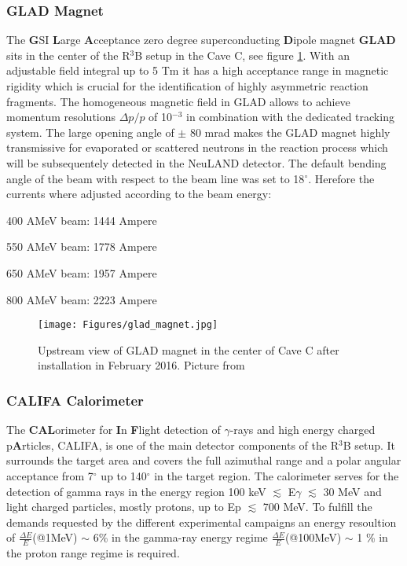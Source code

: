 \subsubsection{GLAD Magnet}
The \textbf{G}SI \textbf{L}arge \textbf{A}cceptance zero degree superconducting \textbf{D}ipole magnet \textbf{GLAD} sits in the center of the R$^3$B setup in the Cave C, see figure \ref{fig:GLAD}. With an adjustable field integral up to 5 Tm it has a high acceptance range in magnetic rigidity which is crucial for the identification of highly asymmetric reaction fragments. The homogeneous magnetic field in GLAD allows to achieve momentum resolutions $\Delta p/p$ of 10$^{-3}$ in combination with the dedicated tracking system.\newline
The large opening angle of $\pm$ 80 mrad makes the GLAD magnet highly transmissive for evaporated or scattered neutrons in the reaction process which will be subsequentely detected in the NeuLAND detector.\newline
The default bending angle of the beam with respect to the beam line was set to 18$^{\circ}$. Herefore the currents where adjusted according to the beam energy:
\newenvironment{tight_enumerate}{
\begin{enumerate}
  \setlength{\itemsep}{0pt}
  \setlength{\parskip}{0pt}
}{\end{enumerate}}
\begin{tight_enumerate}
\item 400 AMeV beam: 1444 Ampere
\item 550 AMeV beam: 1778 Ampere
\item 650 AMeV beam: 1957 Ampere
\item 800 AMeV beam: 2223 Ampere
\end{tight_enumerate}
\begin{figure}[htpb]
    \centering
    \texttt{[image: Figures/glad\_magnet.jpg]}
    \caption{
    Upstream view of GLAD magnet in the center of Cave C after installation in February 2016. Picture from \cite{wiki:GLAD} 
    }
    \label{fig:GLAD}
\end{figure}
\subsubsection{CALIFA Calorimeter}\label{sec:califa}
The \textbf{CAL}orimeter for \textbf{I}n \textbf{F}light detection of $\gamma$-rays and high energy charged p\textbf{A}rticles, CALIFA, is one of the main detector components of the R$^3$B setup. It surrounds the target area and covers the full azimuthal range and a polar angular acceptance from 7$^{\circ}$ up to 140$^{\circ}$ in the target region. The calorimeter serves for the detection of gamma rays in the energy region 100 keV $\lesssim$ E\textunderscore$\gamma$ $\lesssim$ 30 MeV and light charged particles, mostly protons, up to E\textunderscore p $\lesssim$ 700 MeV. To fulfill the demands requested by the different experimental campaigns an energy resoultion of $\frac{\Delta E}{E}$(@1MeV) $\sim$ 6\% in the gamma-ray energy regime $\frac{\Delta E}{E}$(@100MeV) $\sim$ 1 \% in the proton range regime is required.\newline

